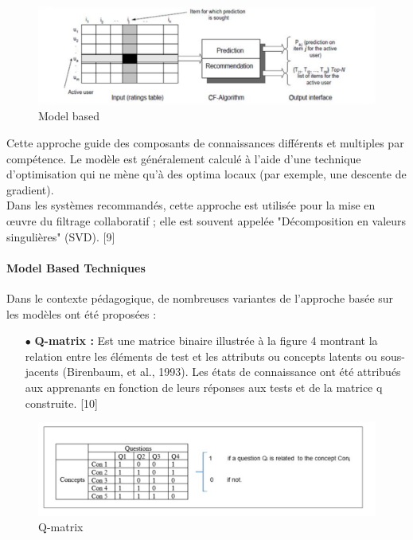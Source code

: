 \begin{figure}[H]
	\begin{center}
		\includegraphics[width=\textwidth]{images/chapitre3/Model_based.png}
	\end{center}
\caption{Model based}
\label{model_based}
\end{figure}

Cette approche guide des composants de connaissances différents et multiples par compétence. Le modèle est généralement calculé à l'aide d'une technique d'optimisation qui ne mène qu'à des optima locaux (par exemple, une descente de gradient). \\
Dans les systèmes recommandés, cette approche est utilisée pour la mise en œuvre du filtrage collaboratif ; elle est souvent appelée "Décomposition en valeurs singulières" (SVD). [9] 

\paragraph{Model Based Techniques}
Dans le contexte pédagogique, de nombreuses variantes de l'approche basée sur les modèles ont été proposées : \\

\begin{itemize}
    \item[$\bullet$] \textbf{Q-matrix :} Est une matrice binaire illustrée à la figure 4 montrant la relation entre les éléments de test et les attributs ou concepts latents ou sous-jacents (Birenbaum, et al., 1993). Les états de connaissance ont été attribués aux apprenants en fonction de leurs réponses aux tests et de la matrice q construite. [10]
\end{itemize}

\begin{figure}[H]
	\begin{center}
		\includegraphics[width=\textwidth]{images/chapitre3/q_matrix.png}
	\end{center}
\caption{Q-matrix}
\label{q_matrix}
\end{figure}

